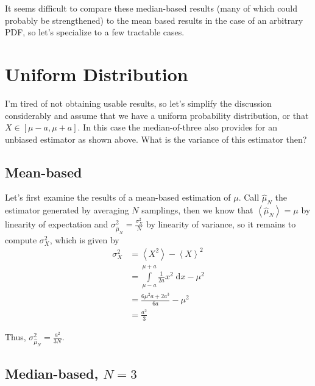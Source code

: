 \documentclass[12pt]{report}
\newcommand{\expvalue}[1]{\left<#1\right>}
\begin{document}
It seems difficult to compare these median-based results (many of which could
probably be strengthened) to the mean based results in the case of an arbitrary
PDF, so let's specialize to a few tractable cases.

\section{Uniform Distribution}

I'm tired of not obtaining usable results, so let's simplify the discussion
considerably and assume that we have a uniform probability distribution, or that
$X \in [\mu - a, \mu + a]$. In this case the median-of-three also provides for
an unbiased estimator as shown above.  What is the variance of this estimator
then?

\subsection{Mean-based}

Let's first examine the results of a mean-based estimation of $\mu$. Call
$\hat{\mu}_N$ the estimator generated by averaging $N$ samplings, then we know
that $\expvalue{\hat{\mu}_N} = \mu$ by linearity of expectation and
$\sigma_{\hat{\mu}_N}^2 = \frac{\sigma_X^2}{N}$ by linearity of variance, so
it remains to compute $\sigma_X^2$, which is given by
\begin{align}
    \sigma_X^2 &= \expvalue{X^2} - \expvalue{X}^2\\
    &= \int\limits_{\mu - a}^{\mu + a}\frac{1}{2a}x^2\;\mathrm{d}x - \mu^2\\
    &= \frac{6\mu^2a + 2a^3}{6a} - \mu^2\\
    &= \frac{a^2}{3}
\end{align}

Thus, $\sigma_{\hat{\mu}_N}^2 = \frac{a^2}{3N}$.

\subsection{Median-based, $N=3$}
\end{document}
